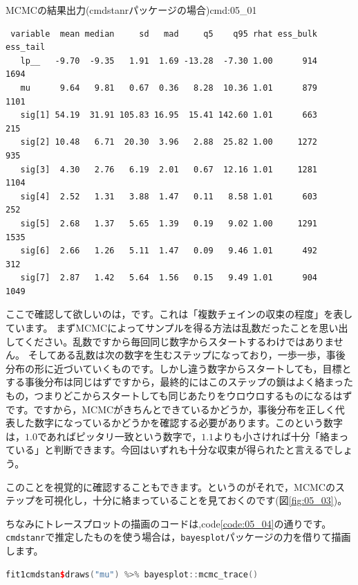 \documentclass{ltjsbook}
\begin{document}
\begin{SCcmd}{MCMCの結果出力(cmdstanrパッケージの場合)}{cmd:05_01}
	\begin{verbatim}
 variable  mean median     sd   mad     q5    q95 rhat ess_bulk ess_tail
   lp__   -9.70  -9.35   1.91  1.69 -13.28  -7.30 1.00      914     1694
   mu      9.64   9.81   0.67  0.36   8.28  10.36 1.01      879     1101
   sig[1] 54.19  31.91 105.83 16.95  15.41 142.60 1.01      663      215
   sig[2] 10.48   6.71  20.30  3.96   2.88  25.82 1.00     1272      935
   sig[3]  4.30   2.76   6.19  2.01   0.67  12.16 1.01     1281     1104
   sig[4]  2.52   1.31   3.88  1.47   0.11   8.58 1.01      603      252
   sig[5]  2.68   1.37   5.65  1.39   0.19   9.02 1.00     1291     1535
   sig[6]  2.66   1.26   5.11  1.47   0.09   9.46 1.01      492      312
   sig[7]  2.87   1.42   5.64  1.56   0.15   9.49 1.01      904     1049
    \end{verbatim}
\end{SCcmd}



ここで確認して欲しいのは，です。これは「複数チェインの収束の程度」を表しています。
まずMCMCによってサンプルを得る方法は乱数だったことを思い出してください。乱数ですから毎回同じ数字からスタートするわけではありません。
そしてある乱数は次の数字を生むステップになっており，一歩一歩，事後分布の形に近づいていくものです。しかし違う数字からスタートしても，目標とする事後分布は同じはずですから，最終的にはこのステップの鎖はよく絡まったもの，つまりどこからスタートしても同じあたりをウロウロするものになるはずです。ですから，MCMCがきちんとできているかどうか，事後分布を正しく代表した数字になっているかどうかを確認する必要があります。このという数字は，$1.0$であればピッタリ一致という数字で，$1.1$よりも小さければ十分「絡まっている」と判断できます。今回はいずれも十分な収束が得られたと言えるでしょう。

このことを視覚的に確認することもできます。というのがそれで，MCMCのステップを可視化し，十分に絡まっていることを見ておくのです(図\ref{fig:05_03})。

ちなみにトレースプロットの描画のコードは,code\ref{code:05_04}の通りです。\texttt{cmdstanr}で推定したものを使う場合は，\verb|bayesplot|パッケージの力を借りて描画します。

\begin{lstlisting}[language=C++,label={code:05_04},caption={トレースプロットの描画}]
fit1cmdstan$draws("mu") %>% bayesplot::mcmc_trace()
\end{lstlisting}
\end{document}
